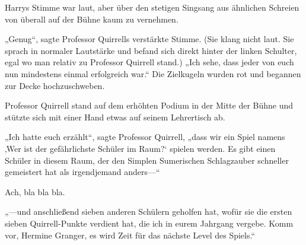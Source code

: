  Harrys Stimme war laut, aber über den stetigen Singsang aus ähnlichen Schreien von überall auf der Bühne kaum zu vernehmen.

„Genug“, sagte Professor Quirrells verstärkte Stimme. (Sie klang nicht laut. Sie sprach in normaler Lautstärke und befand sich direkt hinter der linken Schulter, egal wo man relativ zu Professor Quirrell stand.) „Ich sehe, dass jeder von euch nun mindestens einmal erfolgreich war.“ Die Zielkugeln wurden rot und begannen zur Decke hochzuschweben.

Professor Quirrell stand auf dem erhöhten Podium in der Mitte der Bühne und stützte sich mit einer Hand etwas auf seinem Lehrertisch ab.

„Ich hatte euch erzählt“, sagte Professor Quirrell, „dass wir ein Spiel namens ‚Wer ist der gefährlichste Schüler im Raum?‘ spielen werden. Es gibt einen Schüler in diesem Raum, der den Simplen Sumerischen Schlagzauber schneller gemeistert hat als irgendjemand anders—“

Ach, bla bla bla.

„—und anschließend sieben anderen Schülern geholfen hat, wofür sie die ersten sieben Quirrell-Punkte verdient hat, die ich in eurem Jahrgang vergebe. Komm vor, Hermine Granger, es wird Zeit für das nächste Level des Spiels.“

